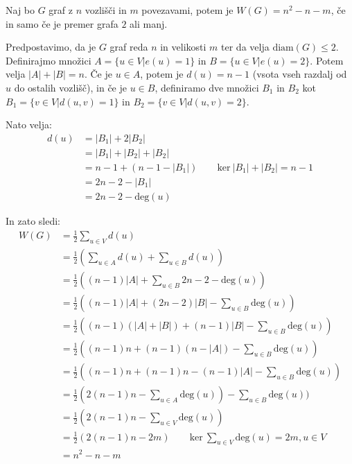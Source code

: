 \documentclass[fin1, tisk]{fmfdelo}
\begin{document}
\begin{izrek}
Naj bo $G$ graf z $n$ vozlišči in $m$ povezavami, potem je $W(G) = n^2 - n - m$, če in samo če je premer grafa $2$ ali manj.
\end{izrek}

\begin{dokaz}
Predpostavimo, da je $G$ graf reda $n$ in velikosti $m$ ter da velja $\text{diam}(G) \leq 2$.
Definirajmo množici $A = \{u \in V | e(u) = 1\}$ in $B = \{u \in V | e(u) = 2\}$. Potem velja $|A| + |B| = n$.
Če je $u \in A$, potem je $d(u) = n - 1$ (vsota vseh razdalj od $u$ do ostalih vozlišč), in če je $u \in B$,
definiramo dve množici $B_1$ in $B_2$ kot $B_1 = \{v \in V | d(u, v) = 1\}$ in $B_2 = \{v \in V | d(u, v) = 2\}$.

Nato velja:
\begin{align*}
d(u) &= |B_1| + 2|B_2| \\
&= |B_1| + |B_2| + |B_2| \\
&= n - 1 + (n - 1 - |B_1|) \qquad \text{ker} \ |B_1| + |B_2| = n - 1 \\
&= 2n - 2 - |B_1| \\
&= 2n - 2 - \text{deg}(u)
\end{align*}

In zato sledi:
\begin{align*}
W(G) &= \frac{1}{2} \sum_{u \in V} d(u) \\
&= \frac{1}{2}( \sum_{u \in A} d(u) + \sum_{u \in B} d(u)) \\
&= \frac{1}{2}( (n - 1)|A| + \sum_{u \in B} 2n - 2 - \text{deg}(u)) \\
&= \frac{1}{2}( (n - 1)|A| + (2n - 2)|B| - \sum_{u \in B} \text{deg}(u)) \\
&= \frac{1}{2}( (n - 1)(|A| + |B|) + (n - 1)|B| - \sum_{u \in B} \text{deg}(u)) \\
&= \frac{1}{2}( (n - 1)n + (n - 1)(n - |A|) - \sum_{u \in B} \text{deg}(u)) \\
&= \frac{1}{2}( (n - 1)n + (n - 1)n - (n - 1)|A| - \sum_{u \in B} \text{deg}(u)) \\
&= \frac{1}{2}( 2(n - 1)n  - \sum_{u \in A} \text{deg}(u)) - \sum_{u \in B} \text{deg}(u)) \\
&= \frac{1}{2}( 2(n - 1)n  - \sum_{u \in V} \text{deg}(u)) \\
&= \frac{1}{2}( 2(n - 1)n  - 2m) \qquad \text{ker} \ \sum_{u \in V} \text{deg}(u) = 2m, u \in V \\
&= n^2 - n - m \\
\end{align*}


\end{dokaz}
\end{document}
